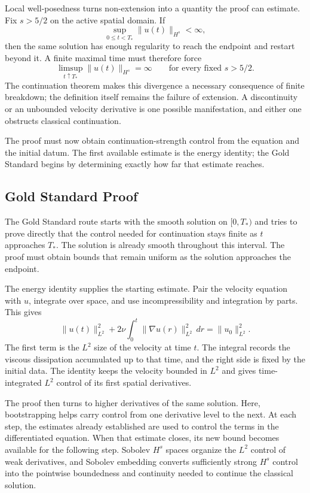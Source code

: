 Local well-posedness turns non-extension into a quantity the proof can
estimate.  Fix \(s>5/2\) on the active spatial domain.  If
\[
  \sup_{0\le t<T_*}\|u(t)\|_{H^s}<\infty,
\]
then the same solution has enough regularity to reach the endpoint and restart
beyond it.  A finite maximal time must therefore force
\[
  \limsup_{t\uparrow T_*}\|u(t)\|_{H^s}=\infty
  \qquad\text{for every fixed }s>5/2.
\]
The continuation theorem makes this divergence a necessary consequence of
finite breakdown; the definition itself remains the failure of extension.  A
discontinuity or an unbounded velocity derivative is one possible
manifestation, and either one obstructs classical continuation.

The proof must now obtain continuation-strength control from the equation and
the initial datum.  The first available estimate is the energy identity; the
Gold Standard begins by determining exactly how far that estimate reaches.

\clearpage
\subsection{Gold Standard Proof}

The Gold Standard route starts with the smooth solution on \([0,T_*)\) and
tries to prove directly that the control needed for continuation stays finite
as \(t\) approaches \(T_*\).  The solution is already smooth throughout this
interval.  The proof must obtain bounds that remain uniform as the solution
approaches the endpoint.

The energy identity supplies the starting estimate.  Pair the velocity
equation with \(u\), integrate over space, and use incompressibility and
integration by parts.  This gives
\[
  \|u(t)\|_{L^2}^2
  +2\nu\int_0^t\|\nabla u(r)\|_{L^2}^2\,dr
  =\|u_0\|_{L^2}^2.
\]
The first term is the \(L^2\) size of the velocity at time \(t\).  The integral
records the viscous dissipation accumulated up to that time, and the right side
is fixed by the initial data.  The identity keeps the velocity bounded in
\(L^2\) and gives time-integrated \(L^2\) control of its first spatial
derivatives.

The proof then turns to higher derivatives of the same solution.  Here,
bootstrapping helps carry control from one derivative level to the next.  At
each step, the estimates already established are used to control the terms in
the differentiated equation.  When that estimate closes, its new bound becomes
available for the following step.  Sobolev \(H^s\) spaces organize the
\(L^2\) control of weak derivatives, and Sobolev embedding converts sufficiently
strong \(H^s\) control into the pointwise boundedness and continuity needed to
continue the classical solution.

